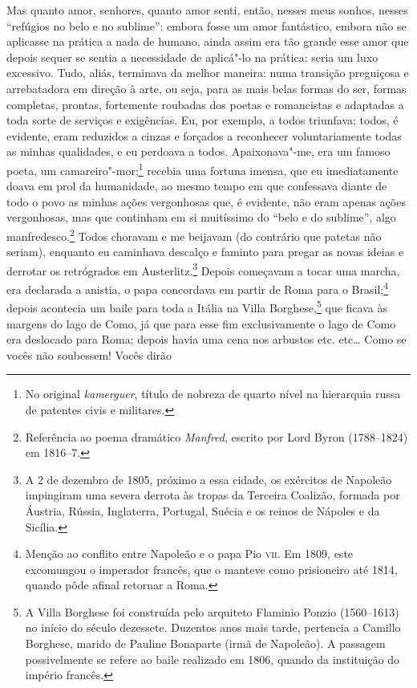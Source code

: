 Mas quanto amor, senhores, quanto amor senti, então, nesses meus sonhos,
nesses “refúgios no belo e no sublime”: embora fosse um amor
fantástico, embora não se aplicasse na prática a nada de humano, ainda
assim era tão grande esse amor que depois sequer se sentia a
necessidade de aplicá"-lo na prática: seria um luxo excessivo. Tudo,
aliás, terminava da melhor maneira: numa transição preguiçosa e
arrebatadora em direção à arte, ou seja, para as mais belas formas do
ser, formas completas, prontas, fortemente roubadas dos poetas e
romancistas e adaptadas a toda sorte de serviços e exigências. Eu, por
exemplo, a todos triunfava; todos, é evidente, eram reduzidos a cinzas
e forçados a reconhecer voluntariamente todas as minhas qualidades, e
eu perdoava a todos. Apaixonava"-me, era um famoso poeta, um
camareiro"-mor;\footnote{ No original \textit{kamerguer}, título de
nobreza de quarto nível na hierarquia russa de patentes civis e militares.}
recebia uma fortuna imensa, que eu imediatamente doava em prol da
humanidade, ao mesmo tempo em que confessava diante de todo o povo as
minhas ações vergonhosas que, é evidente, não eram apenas ações
vergonhosas, mas que continham em si muitíssimo do “belo e do sublime”,
algo manfredesco.\footnote{ Referência ao poema dramático
\textit{Manfred}, escrito por Lord Byron (1788--1824) em 1816--7.} Todos
choravam e me beijavam (do contrário que patetas não seriam), enquanto
eu caminhava descalço e faminto para pregar as novas ideias e derrotar
os retrógrados em Austerlitz.\footnote{ A 2 de dezembro de 1805,
próximo a essa cidade, os exércitos de Napoleão impingiram uma
severa derrota às tropas da Terceira Coalizão, formada por Áustria,
Rússia, Inglaterra, Portugal, Suécia e os reinos de Nápoles e da
Sicília.} Depois começavam a tocar uma marcha, era declarada a anistia,
o papa concordava em partir de Roma para o Brasil;\footnote{ Menção ao
conflito entre Napoleão e o papa Pio \textsc{vii}. Em 1809, este excomungou o
imperador francês, que o manteve como prisioneiro até 1814, quando pôde
afinal retornar a Roma.} depois acontecia um baile para toda a Itália
na Villa Borghese,\footnote{ A Villa Borghese foi construída pelo
arquiteto Flaminio Ponzio (1560--1613) no início do século dezessete.
Duzentos anos mais tarde, pertencia a Camillo Borghese, marido de
Pauline Bonaparte (irmã de Napoleão). A passagem possivelmente se
refere ao baile realizado em 1806, quando da instituição do império
francês.} que ficava às margens do lago de Como, já que para esse fim
exclusivamente o lago de Como era deslocado para Roma; depois havia uma
cena nos arbustos etc. etc\ldots{} Como se vocês não soubessem! Vocês dirão
